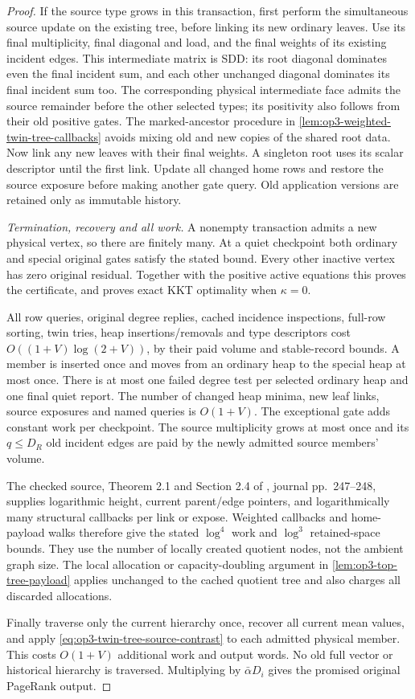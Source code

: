 \begin{proof}
If the source type grows in this transaction, first perform the simultaneous
source update on the existing tree, before linking its new ordinary leaves.
Use its final multiplicity, final diagonal and load, and the final weights
of its existing incident edges. This intermediate matrix is SDD: its root
diagonal dominates even the final incident sum, and each other unchanged
diagonal dominates its final incident sum too. The corresponding physical
intermediate face admits the source remainder before the other selected
types; its positivity also follows from their old positive gates. The
marked-ancestor procedure in
\cref{lem:op3-weighted-twin-tree-callbacks} avoids mixing old and new copies
of the shared root data. Now link any new leaves with their final weights.
A singleton root uses its scalar descriptor until the first link. Update
all changed home rows and restore the source exposure before making another
gate query. Old application versions are retained only as immutable history.

\emph{Termination, recovery and all work.}
A nonempty transaction admits a new physical vertex, so there are finitely
many. At a quiet checkpoint both ordinary and special original gates
satisfy the stated bound. Every other inactive vertex has zero original
residual. Together with the positive active equations this proves the
certificate, and proves exact KKT optimality when $\kappa=0$.

All row queries, original degree replies, cached incidence inspections,
full-row sorting, twin tries, heap insertions/removals and type descriptors
cost $O((1+V)\log(2+V))$, by their paid volume and stable-record bounds.
A member is inserted once and moves from an ordinary heap to the special
heap at most once. There is at most one failed degree test per selected
ordinary heap and one final quiet report. The number of changed heap
minima, new leaf links, source exposures and named queries is $O(1+V)$.
The exceptional gate adds constant work per checkpoint. The source
multiplicity grows at most once and its $q\leq D_R$ old incident edges
are paid by the newly admitted source members' volume.

The checked source, Theorem 2.1 and Section 2.4 of
\cite{alstrup2005toptrees}, journal pp.\ 247--248, supplies logarithmic
height, current parent/edge pointers, and logarithmically many structural
callbacks per link or expose. Weighted callbacks and home-payload walks
therefore give the stated $\log^4$ work and $\log^3$ retained-space
bounds. They use the number of locally created quotient nodes, not the
ambient graph size. The local allocation or capacity-doubling argument in
\cref{lem:op3-top-tree-payload} applies unchanged to the cached quotient
tree and also charges all discarded allocations.

Finally traverse only the current hierarchy once, recover all current
mean values, and apply \eqref{eq:op3-twin-tree-source-contrast} to each
admitted physical member. This costs $O(1+V)$ additional work and output
words. No old full vector or historical hierarchy is traversed. Multiplying
by $\bar\alpha D_i$ gives the promised original PageRank output.
\end{proof}


